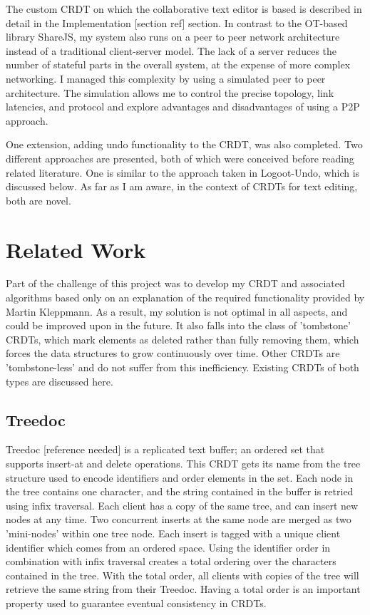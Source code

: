 \documentclass[12pt,a4paper,twoside,openright]{report}
\begin{document}
The custom CRDT on which the collaborative text editor is based is described in detail in the Implementation [section ref] section. In contrast to the OT-based library ShareJS, my system also runs on a peer to peer network architecture instead of a traditional client-server model. The lack of a server reduces the number of stateful parts in the overall system, at the expense of more complex networking. I managed this complexity by using a simulated peer to peer architecture. The simulation allows me to control the precise topology, link latencies, and protocol and explore advantages and disadvantages of using a P2P approach. 

One extension, adding undo functionality to the CRDT, was also completed. Two different approaches are presented, both of which were conceived before reading related literature. One is similar to the approach taken in Logoot-Undo, which is discussed below. As far as I am aware, in the context of CRDTs for text editing, both are novel.

\section{Related Work}

Part of the challenge of this project was to develop my CRDT and associated algorithms based only on an explanation of the required functionality provided by Martin Kleppmann. As a result, my solution is not optimal in all aspects, and could be improved upon in the future. It also falls into the class of 'tombstone' CRDTs, which mark elements as deleted rather than fully removing them, which forces the data structures to grow continuously over time. Other CRDTs are 'tombstone-less' and do not suffer from this inefficiency. Existing CRDTs of both types are discussed here.

\subsection{Treedoc}

Treedoc [reference needed] is a replicated text buffer; an ordered set that supports insert-at and delete operations. This CRDT gets its name from the tree structure used to encode identifiers and order elements in the set. Each node in the tree contains one character, and the string contained in the buffer is retried using infix traversal. Each client has a copy of the same tree, and can insert new nodes at any time. Two concurrent inserts at the same node are merged as two 'mini-nodes' within one tree node. Each insert is tagged with a unique client identifier which comes from an ordered space. Using the identifier order in combination with infix traversal creates a total ordering over the characters contained in the tree. With the total order, all clients with copies of the tree will retrieve the same string from their Treedoc. Having a total order is an important property used to guarantee eventual consistency in CRDTs.
\end{document}
